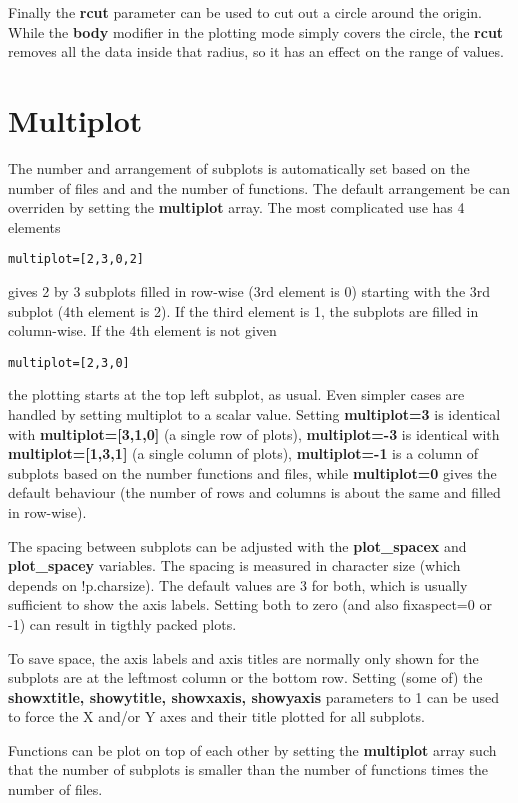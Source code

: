 \documentclass{article}
\begin{document}
Finally the {\bf rcut} parameter can be used to cut out a circle around
the origin. While the {\bf body} modifier in the plotting mode simply covers
the circle, the {\bf rcut} removes all the data inside that radius,
so it has an effect on the range of values.

\section{Multiplot \label{s-multiplot}}

The number and arrangement of subplots is automatically set based 
on the number of files and and the number of functions. 
The default arrangement be can overriden by setting the
{\bf multiplot} array. The most complicated use has 4 elements
\begin{verbatim}
multiplot=[2,3,0,2]
\end{verbatim} 
gives 2 by 3 subplots filled in row-wise (3rd element is 0) 
starting with the 3rd subplot (4th element is 2). If the third element is 1,
the subplots are filled in column-wise. If the 4th element is not given 
\begin{verbatim}
multiplot=[2,3,0]
\end{verbatim} 
the plotting starts at the top left subplot, as usual. Even simpler
cases are handled by setting multiplot to a scalar value.
Setting {\bf multiplot=3} is identical with {\bf multiplot=[3,1,0]} 
(a single row of plots), {\bf multiplot=-3} is identical with 
{\bf multiplot=[1,3,1]} (a single column of plots), 
{\bf multiplot=-1} is a column of subplots based on the number 
functions and files, while {\bf multiplot=0} gives the default
behaviour (the number of rows and columns is about the same and
filled in row-wise).

The spacing between subplots can be adjusted with the
{\bf plot\_spacex} and {\bf plot\_spacey} variables.
The spacing is measured in character size (which depends on !p.charsize).
The default values are 3 for both, which is usually sufficient to
show the axis labels. Setting both to zero (and also fixaspect=0 or -1)
can result in tigthly packed plots. 

To save space, the axis labels and axis titles are normally only shown 
for the subplots are at the leftmost column or the bottom row.
Setting (some of) the {\bf showxtitle, showytitle, showxaxis, showyaxis} 
parameters to 1 can be used to force the X and/or Y axes and their title plotted
for all subplots.

Functions can be plot on top of each other by setting the {\bf multiplot}
array such that the number of subplots is smaller than the number of
functions times the number of files.  
\end{document}
